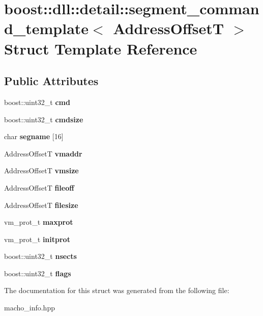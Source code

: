 \hypertarget{a01556}{}\section{boost\+:\+:dll\+:\+:detail\+:\+:segment\+\_\+command\+\_\+template$<$ Address\+OffsetT $>$ Struct Template Reference}
\label{a01556}
\subsection*{Public Attributes}
\begin{DoxyCompactItemize}
\item 
\mbox{\label{a01556_ac84bb0367bcfc8616c89e6ffba706f2b}} 
boost\+::uint32\+\_\+t {\bfseries cmd}
\item 
\mbox{\label{a01556_ae2c0634447fcb160abe26743608ba332}} 
boost\+::uint32\+\_\+t {\bfseries cmdsize}
\item 
\mbox{\label{a01556_aaa669f831569da1e8d99fbe060e79b77}} 
char {\bfseries segname} \mbox{[}16\mbox{]}
\item 
\mbox{\label{a01556_a40c4df13a77be36ca665e597146544bb}} 
Address\+OffsetT {\bfseries vmaddr}
\item 
\mbox{\label{a01556_ae8c1db7cb37705dbe467577602126761}} 
Address\+OffsetT {\bfseries vmsize}
\item 
\mbox{\label{a01556_a58bd62a23d342c055ac98c1cce7aa4b3}} 
Address\+OffsetT {\bfseries fileoff}
\item 
\mbox{\label{a01556_a317b4fe594245cc77a8d5d01d272625b}} 
Address\+OffsetT {\bfseries filesize}
\item 
\mbox{\label{a01556_a8e602b5e6938ef869de46a5c1ea25fe6}} 
vm\+\_\+prot\+\_\+t {\bfseries maxprot}
\item 
\mbox{\label{a01556_af2f3f91f984cd716e60cb4dc76fbcbc0}} 
vm\+\_\+prot\+\_\+t {\bfseries initprot}
\item 
\mbox{\label{a01556_af161f4ec9bffd02131f5d6cc48bd34ba}} 
boost\+::uint32\+\_\+t {\bfseries nsects}
\item 
\mbox{\label{a01556_a8c8820a89a1a3e795fafd568a9b16b5a}} 
boost\+::uint32\+\_\+t {\bfseries flags}
\end{DoxyCompactItemize}


The documentation for this struct was generated from the following file\+:\begin{DoxyCompactItemize}
\item 
macho\+\_\+info.\+hpp\end{DoxyCompactItemize}
